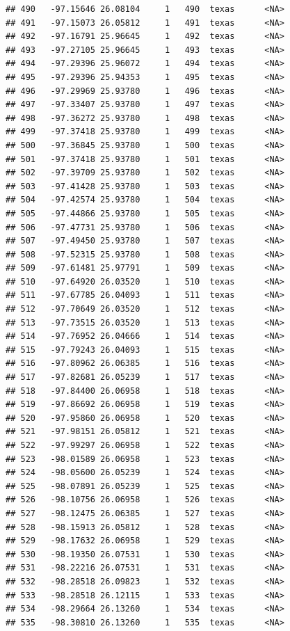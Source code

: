\documentclass[
]{article}
\begin{document}
\begin{verbatim}
## 490   -97.15646 26.08104     1   490  texas      <NA>
## 491   -97.15073 26.05812     1   491  texas      <NA>
## 492   -97.16791 25.96645     1   492  texas      <NA>
## 493   -97.27105 25.96645     1   493  texas      <NA>
## 494   -97.29396 25.96072     1   494  texas      <NA>
## 495   -97.29396 25.94353     1   495  texas      <NA>
## 496   -97.29969 25.93780     1   496  texas      <NA>
## 497   -97.33407 25.93780     1   497  texas      <NA>
## 498   -97.36272 25.93780     1   498  texas      <NA>
## 499   -97.37418 25.93780     1   499  texas      <NA>
## 500   -97.36845 25.93780     1   500  texas      <NA>
## 501   -97.37418 25.93780     1   501  texas      <NA>
## 502   -97.39709 25.93780     1   502  texas      <NA>
## 503   -97.41428 25.93780     1   503  texas      <NA>
## 504   -97.42574 25.93780     1   504  texas      <NA>
## 505   -97.44866 25.93780     1   505  texas      <NA>
## 506   -97.47731 25.93780     1   506  texas      <NA>
## 507   -97.49450 25.93780     1   507  texas      <NA>
## 508   -97.52315 25.93780     1   508  texas      <NA>
## 509   -97.61481 25.97791     1   509  texas      <NA>
## 510   -97.64920 26.03520     1   510  texas      <NA>
## 511   -97.67785 26.04093     1   511  texas      <NA>
## 512   -97.70649 26.03520     1   512  texas      <NA>
## 513   -97.73515 26.03520     1   513  texas      <NA>
## 514   -97.76952 26.04666     1   514  texas      <NA>
## 515   -97.79243 26.04093     1   515  texas      <NA>
## 516   -97.80962 26.06385     1   516  texas      <NA>
## 517   -97.82681 26.05239     1   517  texas      <NA>
## 518   -97.84400 26.06958     1   518  texas      <NA>
## 519   -97.86692 26.06958     1   519  texas      <NA>
## 520   -97.95860 26.06958     1   520  texas      <NA>
## 521   -97.98151 26.05812     1   521  texas      <NA>
## 522   -97.99297 26.06958     1   522  texas      <NA>
## 523   -98.01589 26.06958     1   523  texas      <NA>
## 524   -98.05600 26.05239     1   524  texas      <NA>
## 525   -98.07891 26.05239     1   525  texas      <NA>
## 526   -98.10756 26.06958     1   526  texas      <NA>
## 527   -98.12475 26.06385     1   527  texas      <NA>
## 528   -98.15913 26.05812     1   528  texas      <NA>
## 529   -98.17632 26.06958     1   529  texas      <NA>
## 530   -98.19350 26.07531     1   530  texas      <NA>
## 531   -98.22216 26.07531     1   531  texas      <NA>
## 532   -98.28518 26.09823     1   532  texas      <NA>
## 533   -98.28518 26.12115     1   533  texas      <NA>
## 534   -98.29664 26.13260     1   534  texas      <NA>
## 535   -98.30810 26.13260     1   535  texas      <NA>

\end{verbatim}
\end{document}
